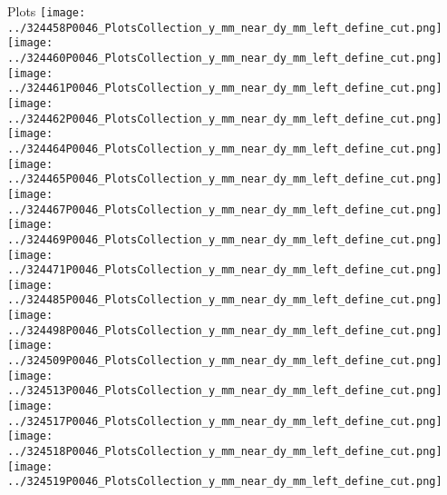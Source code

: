 \documentclass{beamer}
\begin{document}
\begin{frame}\tiny
        \begin{block}{Plots}
		  \centering
                \texttt{[image: ../324458P0046\_PlotsCollection\_y\_mm\_near\_dy\_mm\_left\_define\_cut.png]}
                \texttt{[image: ../324460P0046\_PlotsCollection\_y\_mm\_near\_dy\_mm\_left\_define\_cut.png]}
                \texttt{[image: ../324461P0046\_PlotsCollection\_y\_mm\_near\_dy\_mm\_left\_define\_cut.png]}
                \texttt{[image: ../324462P0046\_PlotsCollection\_y\_mm\_near\_dy\_mm\_left\_define\_cut.png]}
                \texttt{[image: ../324464P0046\_PlotsCollection\_y\_mm\_near\_dy\_mm\_left\_define\_cut.png]}\\
                \texttt{[image: ../324465P0046\_PlotsCollection\_y\_mm\_near\_dy\_mm\_left\_define\_cut.png]}
                \texttt{[image: ../324467P0046\_PlotsCollection\_y\_mm\_near\_dy\_mm\_left\_define\_cut.png]}
                \texttt{[image: ../324469P0046\_PlotsCollection\_y\_mm\_near\_dy\_mm\_left\_define\_cut.png]}
                \texttt{[image: ../324471P0046\_PlotsCollection\_y\_mm\_near\_dy\_mm\_left\_define\_cut.png]}
                \texttt{[image: ../324485P0046\_PlotsCollection\_y\_mm\_near\_dy\_mm\_left\_define\_cut.png]}\\
                \texttt{[image: ../324498P0046\_PlotsCollection\_y\_mm\_near\_dy\_mm\_left\_define\_cut.png]}
                \texttt{[image: ../324509P0046\_PlotsCollection\_y\_mm\_near\_dy\_mm\_left\_define\_cut.png]}
                \texttt{[image: ../324513P0046\_PlotsCollection\_y\_mm\_near\_dy\_mm\_left\_define\_cut.png]}
                \texttt{[image: ../324517P0046\_PlotsCollection\_y\_mm\_near\_dy\_mm\_left\_define\_cut.png]}
                \texttt{[image: ../324518P0046\_PlotsCollection\_y\_mm\_near\_dy\_mm\_left\_define\_cut.png]}\\
                \texttt{[image: ../324519P0046\_PlotsCollection\_y\_mm\_near\_dy\_mm\_left\_define\_cut.png]}

\end{block}
\end{frame}
\end{document}
